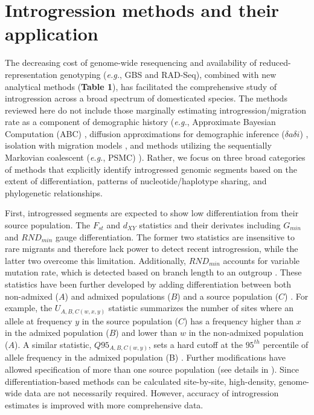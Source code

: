 \documentclass[11pt]{article}
\begin{document}
\section*{Introgression methods and their application}


The decreasing cost of genome-wide resequencing and availability of reduced-representation genotyping (\emph{e.g.}, GBS and RAD-Seq), combined with new analytical methods (\textbf{Table 1}), has facilitated the comprehensive study of introgression across a broad spectrum of domesticated species.
The methods reviewed here do not include those marginally estimating introgression\slash migration rate as a component of demographic history (\emph{e.g.}, Approximate Bayesian Computation (ABC) \cite{beaumont2002}, diffusion approximations for demographic inference ($\delta a\delta i$) \cite{gutenkunst2009}, isolation with migration models \cite{hey2004}, and methods utilizing the sequentially Markovian coalescent (\emph{e.g.}, PSMC) \cite{li2011}). 
Rather, we focus on three broad categories of methods that explicitly identify introgressed genomic segments based on the extent of differentiation, patterns of nucleotide/haplotype sharing, and phylogenetic relationships.

First, introgressed segments are expected to show low differentiation from their source population.
The $F_{st}$ and $d_{XY}$ statistics and their derivates including $G_{min}$ \cite{geneva2015} and $RND_{min}$\cite{rosenzweig2016} gauge differentiation. 
The former two statistics are insensitive to rare migrants and therefore lack power to detect recent introgression, while the latter two overcome this limitation.
Additionally, $RND_{min}$ accounts for variable mutation rate, which is detected based on branch length to an outgroup \cite{rosenzweig2016}.
These statistics have been further developed by adding differentiation between both non-admixed ($A$) and admixed populations ($B$) and a source population ($C$) \cite{racimo2016}. 
For example, the $U_{A,B,C(w,x,y)}$ statistic summarizes the number of sites where an allele at frequency $y$ in the source population ($C$) has a frequency higher than $x$ in the admixed population ($B$) and lower than $w$ in the non-admixed population ($A$).
A similar statistic, $Q95_{A,B,C(w,y)}$, sets a hard cutoff at the $95^{th}$ percentile of allele frequency in the admixed population (B) \cite{racimo2016}.
Further modifications have allowed specification of more than one source population (see details in \cite{racimo2016}).
Since differentiation-based methods can be calculated site-by-site, high-density, genome-wide data are not necessarily required.
However, accuracy of introgression estimates is improved with more comprehensive data.
 
\end{document}

